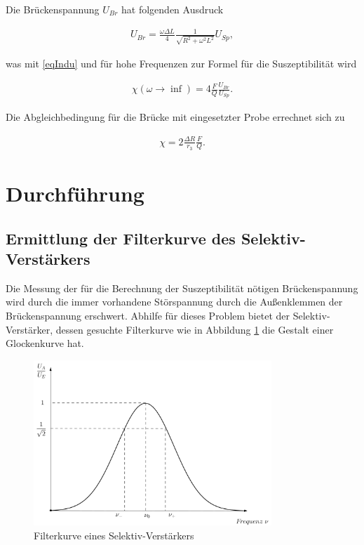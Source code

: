 Die Brückenspannung $U_{Br}$ hat folgenden Ausdruck

\begin{align}
 U_{Br} = \frac{\omega \Delta L}{4} \frac{1}{\sqrt{R^2+\omega^2L^2}} U_{Sp},
\end{align}

was mit \eqref{eqIndu} und für hohe Frequenzen zur Formel für die Suszeptibilität wird

\begin{align}
 \chi(\omega \to \inf) = 4 \frac{F}{Q} \frac{U_{Br}}{U_{Sp}}.
\end{align}

Die Abgleichbedingung für die Brücke mit eingesetzter Probe errechnet sich zu 

\begin{align}
 \chi = 2 \frac{\Delta R}{r_3} \frac{F}{Q}.
 \label{eq_chi_rechnung}
\end{align}

\section{Durchführung}
\subsection{Ermittlung der Filterkurve des Selektiv-Verstärkers}
Die Messung der für die Berechnung der Suszeptibilität nötigen Brückenspannung wird durch die immer vorhandene Störspannung durch
die Außenklemmen der Brückenspannung erschwert. Abhilfe für dieses Problem bietet der Selektiv-Verstärker, dessen gesuchte Filterkurve
wie in Abbildung \ref{picfilter} die Gestalt einer Glockenkurve hat. 

\begin{figure}[H]
 \includegraphics[width=0.8\textwidth]{pics/filterkurve.png}
 \caption{Filterkurve eines Selektiv-Verstärkers}
 \label{picfilter}
\end{figure}

